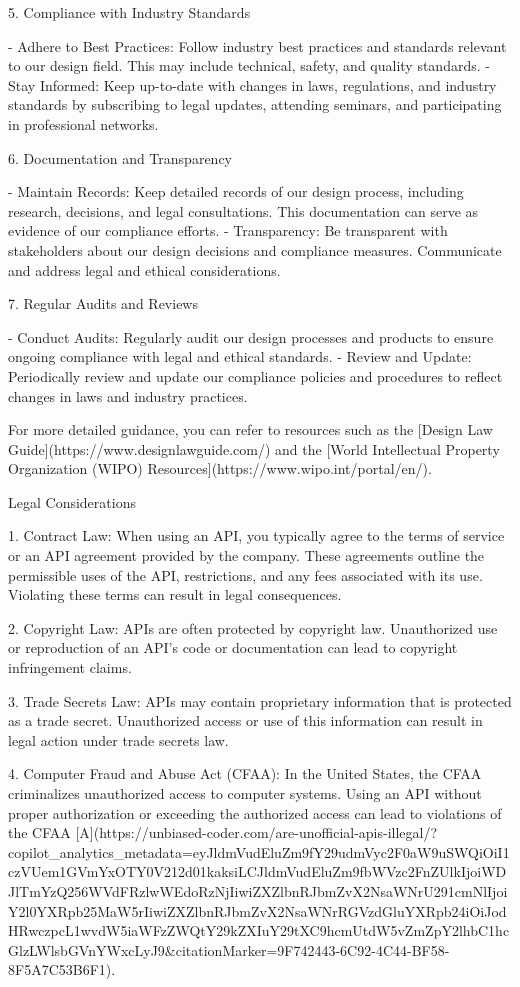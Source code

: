 \documentclass[12pt,letterpaper]{article}
\begin{document}
 5. Compliance with Industry Standards

- Adhere to Best Practices: Follow industry best practices and standards relevant to our design field. This may include technical, safety, and quality standards.
- Stay Informed: Keep up-to-date with changes in laws, regulations, and industry standards by subscribing to legal updates, attending seminars, and participating in professional networks.

 6. Documentation and Transparency

- Maintain Records: Keep detailed records of our design process, including research, decisions, and legal consultations. This documentation can serve as evidence of our compliance efforts.
- Transparency: Be transparent with stakeholders about our design decisions and compliance measures. Communicate and address legal and ethical considerations.

 7. Regular Audits and Reviews

- Conduct Audits: Regularly audit our design processes and products to ensure ongoing compliance with legal and ethical standards.
- Review and Update: Periodically review and update our compliance policies and procedures to reflect changes in laws and industry practices.

For more detailed guidance, you can refer to resources such as the [Design Law Guide](https://www.designlawguide.com/) and the [World Intellectual Property Organization (WIPO) Resources](https://www.wipo.int/portal/en/).


 Legal Considerations

1. Contract Law: When using an API, you typically agree to the terms of service or an API agreement provided by the company. These agreements outline the permissible uses of the API, restrictions, and any fees associated with its use. Violating these terms can result in legal consequences.

2. Copyright Law: APIs are often protected by copyright law. Unauthorized use or reproduction of an API's code or documentation can lead to copyright infringement claims.

3. Trade Secrets Law: APIs may contain proprietary information that is protected as a trade secret. Unauthorized access or use of this information can result in legal action under trade secrets law.

4. Computer Fraud and Abuse Act (CFAA): In the United States, the CFAA criminalizes unauthorized access to computer systems. Using an API without proper authorization or exceeding the authorized access can lead to violations of the CFAA [A](https://unbiased-coder.com/are-unofficial-apis-illegal/?copilot_analytics_metadata=eyJldmVudEluZm9fY29udmVyc2F0aW9uSWQiOiI1czVUem1GVmYxOTY0V212d01kaksiLCJldmVudEluZm9fbWVzc2FnZUlkIjoiWDJlTmYzQ256WVdFRzlwWEdoRzNjIiwiZXZlbnRJbmZvX2NsaWNrU291cmNlIjoiY2l0YXRpb25MaW5rIiwiZXZlbnRJbmZvX2NsaWNrRGVzdGluYXRpb24iOiJodHRwczpcL1wvdW5iaWFzZWQtY29kZXIuY29tXC9hcmUtdW5vZmZpY2lhbC1hcGlzLWlsbGVnYWxcLyJ9&citationMarker=9F742443-6C92-4C44-BF58-8F5A7C53B6F1).
\end{document}
